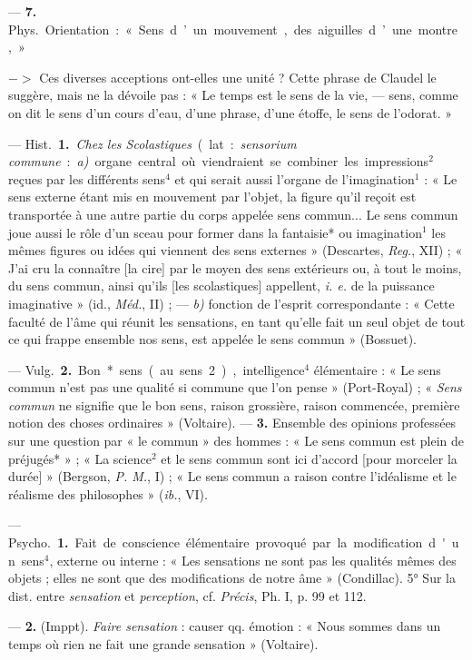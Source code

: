 \begin{itemize}[leftmargin=1cm, label=, itemsep=1pt]
— {\bf 7.} \si{Phys.} Orientation : « Sens d’un mouvement, des aiguilles
d’une montre, »

$->$ Ces diverses acceptions ont-elles une unité ? Cette phrase de Claudel le
suggère, mais ne la dévoile pas : « Le temps est le sens de la vie, — sens,
comme on dit le sens d’un cours d’eau, d’une phrase, d’une étoffe, le sens de
l'odorat. »

 — \si{Hist.} {\bf 1.} {\it Chez les
Scolastiques} (lat. : {\it sensorium commune} :
{\it a)} organe central où viendraient se combiner les impressions$^2$ reçues
par les différents sens$^4$ et qui serait aussi l'organe de
l'imagination$^1$ : « Le sens externe étant mis en mouvement par l'objet, la
figure qu’il reçoit est transportée à une autre partie du corps appelée sens
commun... Le sens commun joue aussi le rôle d’un sceau pour former dans la
fantaisie* ou imagination$^1$ les mêmes figures ou idées qui viennent des
sens externes » (Descartes, {\it Reg.}, XII) ; « J'ai cru la connaître [la
cire] par le moyen des sens extérieurs ou, à tout le moins, du sens commun,
ainsi qu'ils [les scolastiques] appellent, {\it i. e.} de la puissance
imaginative » (id., {\it Méd.}, II) ; — {\it b)} fonction de l'esprit
correspondante : « Cette faculté de l’âme qui réunit les sensations, en tant
qu'elle fait un seul objet de tout ce qui frappe ensemble nos sens, est
appelée le sens commun » (Bossuet).

— \si{Vulg.} {\bf 2.} Bon* sens (au sens 2), intelligence$^4$ élémentaire :
« Le sens commun n’est pas une qualité si commune que l’on pense »
(Port-Royal) ; « {\it Sens commun} ne signifie que le bon sens, raison
grossière, raison commencée, première notion des choses ordinaires
» (Voltaire). —  {\bf 3.} Ensemble des opinions professées sur une question
par « le commun » des hommes : « Le sens commun est plein de préjugés* » ; «
La science$^2$ et le sens commun sont ici d'accord [pour morceler la durée]
» (Bergson, {\it P. M.}, I) ; « Le sens commun a raison contre l'idéalisme et
le réalisme des philosophes » ({\it ib.}, VI).

 — \si{Psycho.} {\bf 1.} Fait de conscience élémentaire
provoqué par la modification d'un sens$^4$, externe ou interne : « Les
sensations ne sont pas les qualités mêmes des objets ;
elles ne sont que des modifications de notre âme » (Condillac). 5° Sur la
dist. entre {\it sensation} et {\it perception}, cf. {\it Précis}, Ph. I,
p. 99 et 112.

— {\bf 2.} (Imppt). {\it Faire sensation} : causer qq. émotion : « Nous
sommes dans un temps où rien ne fait une grande sensation » (Voltaire).


\end{itemize}
